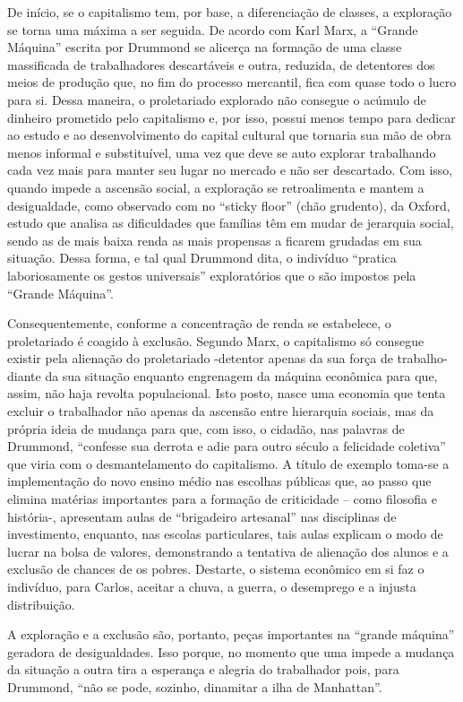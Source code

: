 \documentclass{article}
\begin{document}
De início, se o capitalismo tem, por base, a diferenciação de classes, a exploração se torna uma máxima a ser seguida. De acordo com Karl Marx, a “Grande Máquina” escrita por Drummond se alicerça na formação de uma classe massificada de trabalhadores descartáveis e outra, reduzida, de detentores dos meios de produção que, no fim do processo mercantil, fica com quase todo o lucro para si. Dessa maneira, o proletariado explorado não consegue o acúmulo de dinheiro prometido pelo capitalismo e, por isso, possui menos tempo para dedicar ao estudo e ao desenvolvimento do capital cultural que tornaria sua mão de obra menos informal e substituível, uma vez que deve se auto explorar trabalhando cada vez mais para manter seu lugar no mercado e não ser descartado. Com isso, quando impede a ascensão social, a exploração se retroalimenta e mantem a desigualdade, como observado com no “sticky floor” (chão grudento), da Oxford, estudo que analisa as dificuldades que famílias têm em mudar de jerarquia social, sendo as de mais baixa renda as mais propensas a ficarem grudadas em sua situação. Dessa forma, e tal qual Drummond dita, o indivíduo “pratica laboriosamente os gestos universais” exploratórios que o são impostos pela “Grande Máquina”.


Consequentemente, conforme a concentração de renda se estabelece, o proletariado é coagido à exclusão. Segundo Marx, o capitalismo só consegue existir pela alienação do proletariado -detentor apenas da sua força de trabalho- diante da sua situação enquanto engrenagem da máquina econômica para que, assim, não haja revolta populacional. Isto posto, nasce uma economia que tenta excluir o trabalhador não apenas da ascensão entre hierarquia sociais, mas da própria ideia de mudança para que, com isso, o cidadão, nas palavras de Drummond, “confesse sua derrota e adie para outro século a felicidade coletiva” que viria com o desmantelamento do capitalismo. A título de exemplo toma-se a implementação do novo ensino médio nas escolhas públicas que, ao passo que elimina matérias importantes para a formação de criticidade – como filosofia e história-, apresentam aulas de “brigadeiro artesanal” nas disciplinas de investimento, enquanto, nas escolas particulares, tais aulas explicam o modo de lucrar na bolsa de valores, demonstrando a tentativa de alienação dos alunos e a exclusão de chances de os pobres. Destarte, o sistema econômico em si faz o indivíduo, para Carlos, aceitar a chuva, a guerra, o desemprego e a injusta distribuição.


A exploração e a exclusão são, portanto, peças importantes na “grande máquina” geradora de desigualdades. Isso porque, no momento que uma impede a mudança da situação a outra tira a esperança e alegria do trabalhador pois, para Drummond, “não se pode, sozinho, dinamitar a ilha de Manhattan”. 
\end{document}
